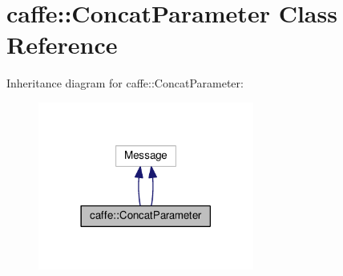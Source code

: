 \hypertarget{classcaffe_1_1_concat_parameter}{}\section{caffe\+:\+:Concat\+Parameter Class Reference}
\label{classcaffe_1_1_concat_parameter}


Inheritance diagram for caffe\+:\+:Concat\+Parameter\+:
\nopagebreak
\begin{figure}[H]
\begin{center}
\leavevmode
\includegraphics[width=201pt]{classcaffe_1_1_concat_parameter__inherit__graph}
\end{center}
\end{figure}
